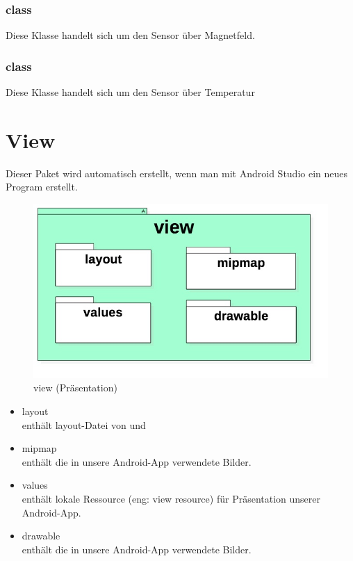 \documentclass[a4paper]{scrreprt}
\begin{document}
                \subsubsection{class }
                Diese Klasse handelt sich um den Sensor über Magnetfeld.
                \subsubsection{class }
                Diese Klasse handelt sich um den Sensor über Temperatur

        \newpage
        \section{View}

            Dieser Paket wird automatisch erstellt,  wenn man mit Android Studio ein neues Program erstellt.

            \vspace*{1cm}
            \begin{figure}[H]
                \centering
                \includegraphics[scale = 0.7]{view.jpg}
                \caption{view (Präsentation)}
            \end{figure}

            \begin{itemize}
                \item layout \\
                    enthält layout-Datei von  und 
                \item mipmap \\
                    enthält die in unsere Android-App verwendete Bilder.
                \item values\\
                    enthält lokale Ressource (eng: view resource) für Präsentation unserer Android-App.
                \item drawable\\
                    enthält die in unsere Android-App verwendete Bilder.
            \end{itemize}
\end{document}

